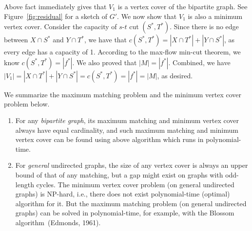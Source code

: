 \documentclass[letterpaper,11pt]{article}
\theoremstyle{mytheorem}
\begin{document}
Above fact immediately gives that $V_1$ is a vertex cover of the bipartite graph.
See Figure~\ref{fig:residual} for a sketch of $G'$.
We now show that $V_1$ is also a minimum vertex cover.
Consider the capacity of $s$-$t$ cut $(S^*, T^*)$. 
Since there is no edge between $X\cap S^*$ and $Y\cap T^*$, we have
that $c(S^*, T^*) = |X\cap T^*| + |Y\cap S^*|$, as every edge has a capacity of 1.
According to the max-flow min-cut theorem, we know 
$c(S^*, T^*) = |f^*|$. We also proved that $|M| = |f^*|$. Combined, 
we have $|V_1| = |X\cap T^*| + |Y\cap S^*| = c(S^*, T^*) = |f^*| = |M|$, as desired.

We summarize the maximum matching problem and the minimum vertex cover problem below.
\vspace*{-\topsep}
\begin{enumerate}
\item For any \emph{bipartite graph}, its maximum matching
and minimum vertex cover always have equal cardinality,
and such maximum matching and minimum vertex cover
can be found using above algorithm which runs in polynomial-time.
\item For \emph{general} undirected graphs, the size of
any vertex cover is always an upper bound of that of any matching,
but a gap might exist on graphs with odd-length cycles.
The minimum vertex cover problem (on general undirected graphs) is NP-hard, i.e., there does not
exist polynomial-time (optimal) algorithm for it.
But the maximum matching problem (on general undirected graphs) can be solved in polynomial-time,
for example, with the Blossom algorithm~(Edmonds, 1961).
\end{enumerate}
\end{document}
